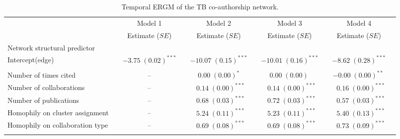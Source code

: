 \begin{table}
\begin{center}
\caption{Temporal ERGM of the TB co-authorship network.}
\label{tab:tb_tergm}
\hspace*{-1cm}
\scriptsize
\begin{tabular}{@{}lcclclclcl@{}}
        \toprule
           &  & Model 1 &  & Model 2  &  & Model 3 &  & Model 4\\ \cmidrule{3-3} \cmidrule{5-5} \cmidrule{7-7} \cmidrule{9-9}
           &  & Estimate ($SE$) &  & Estimate ($SE$)  &  & Estimate ($SE$) &  & Estimate ($SE$)\\
\midrule
Network structural predictor & & & & & & & & \\
\hspace{10pt}Intercept(edge)    &  & $-3.75 \; (0.02)^{***}$ & & $-10.07 \; (0.15)^{***}$ & & $-10.01 \; (0.16)^{***}$ & & $-8.62 \; (0.28)^{***}$ \\\\
Number of times cited       &  &       --    &  & $\hspace{6pt}0.00 \; (0.00)^{*~~~}$   &  & $\hspace{6pt}0.00 \; (0.00)^{~~~~}$      &  & $-0.00 \; (0.00)^{**~}$  \\
Number of collaborations    &  &         --  &  & $\hspace{6pt}0.14 \; (0.00)^{***}$ &  & $\hspace{6pt}0.14 \; (0.00)^{***}$ &  & $\hspace{6pt}0.16 \; (0.00)^{***}$  \\
Number of publications      &  &      --     &  & $\hspace{6pt}0.68 \; (0.03)^{***}$ &  & $\hspace{6pt}0.72 \; (0.03)^{***}$ &  & $\hspace{6pt}0.57 \; (0.03)^{***}$  \\
Homophily on cluster assignment   &  & --     &  & $\hspace{6pt}5.24 \; (0.11)^{***}$ &  & $\hspace{6pt}5.23 \; (0.11)^{***}$ &  & $\hspace{6pt}5.40 \; (0.13)^{***}$  \\
Homophily on collaboration type   &  &   --   &  & $\hspace{6pt}0.69 \; (0.08)^{***}$ &  & $\hspace{6pt}0.69 \; (0.08)^{***}$ &  & $\hspace{6pt}0.73 \; (0.09)^{***}$  \\\\

\end{tabular}
\end{center}
\end{table}
